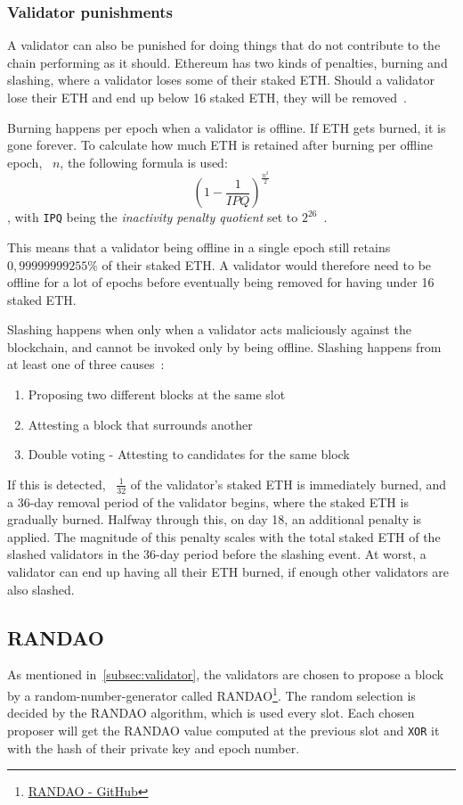 \subsubsection{Validator punishments}\label{subsubsec:valpunish}
A validator can also be punished for doing things that do not contribute to the chain performing as it should.
Ethereum has two kinds of penalties, burning and slashing, where a validator loses some of their staked ETH\@.
Should a validator lose their ETH and end up below 16 staked ETH, they will be removed~\cite{consensus-spec-phase-0}.


Burning happens per epoch when a validator is offline.
If ETH gets burned, it is gone forever.
To calculate how much ETH is retained after burning per offline epoch, ~$n$, the following formula is used:
\begin{equation}
    \left(1-\frac{1}{IPQ}\right)^\frac{n^2}{2}
    \label{eq:burn}
\end{equation},
with \texttt{IPQ} being the \textit{inactivity penalty quotient} set to $2^{26}$~\cite{consensus-spec-phase-0}.


This means that a validator being offline in a single epoch still retains $0,99999999255\%$ of their staked ETH\@.
A validator would therefore need
to be offline for a lot of epochs before eventually being removed for having under 16 staked ETH\@.


Slashing happens when only when a validator acts maliciously against the blockchain,
and cannot be invoked only by being offline.
Slashing happens from at least one of three causes~\cite{PoSRewAndPen}:
\begin{enumerate}
    \item Proposing two different blocks at the same slot
    \item Attesting a block that surrounds another
    \item Double voting - Attesting to candidates for the same block
\end{enumerate}
If this is detected, ~$\frac{1}{32}$ of the validator's staked ETH is immediately burned,
and a 36-day removal period of the validator begins, where the staked ETH is gradually burned.
Halfway through this, on day 18, an additional penalty is applied.
The magnitude of this penalty scales with the total staked ETH of the slashed validators in the 36-day period before the slashing event.
At worst, a validator can end up having all their ETH burned, if enough other validators are also slashed.

\subsection{RANDAO}\label{subsec:randao}
As mentioned in~\autoref{subsec:validator}, the validators are chosen to propose a block by a random-number-generator called RANDAO\footnote{\href{https://github.com/randao/randao}{RANDAO - GitHub}}.
The random selection is decided by the RANDAO algorithm, which is used every slot.
Each chosen proposer will get the RANDAO value computed at the previous slot and \texttt{XOR} it with the hash of their private key and epoch number.


